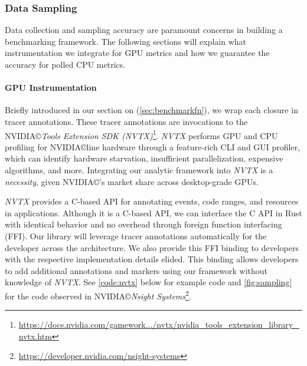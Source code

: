 \subsubsection{Data Sampling}
Data collection and sampling accuracy are paramount concerns in building a benchmarking framework. The following sections will explain what instrumentation we integrate for GPU metrics and how we guarantee the accuracy for polled CPU metrics.

\paragraph{GPU Instrumentation}
Briefly introduced in our section on  (\cref{sec:benchmarkfn}), we wrap each closure in tracer annotations. These tracer annotations are invocations to the NVIDIA\copyright \textit{Tools Extension SDK (NVTX)}\footnote{\href{https://docs.nvidia.com/gameworks/content/gameworkslibrary/nvtx/nvidia_tools_extension_library_nvtx.htm}{https://docs.nvidia.com/gamework.../nvtx/nvidia\_tools\_extension\_library\_nvtx.htm}}. \textit{NVTX} performs GPU and CPU profiling for NVIDIA\copyright line hardware through a feature-rich CLI and GUI profiler, which can identify hardware starvation, insufficient parallelization, expensive algorithms, and more. Integrating our analytic framework into \textit{NVTX} is a \emph{necessity}, given NVIDIA\copyright's market share across desktop-grade GPUs.\medskip

\textit{NVTX} provides a C-based API for annotating events, code ranges, and resources in applications. Although it is a C-based API, we can interface the C API in Rust with identical behavior and no overhead through foreign function interfacing (FFI)\cite{Crichton15}. Our library will leverage tracer annotations automatically for the developer across the architecture. We also provide this FFI binding to developers with the respective implementation details elided. This binding allows developers to add additional annotations and markers using our framework without knowledge of \textit{NVTX}. See \cref{code:nvtx} below for example code and \cref{fig:sampling} for the code observed in NVIDIA\copyright \textit{Nsight Systems}\footnote{\href{https://developer.nvidia.com/nsight-systems}{https://developer.nvidia.com/nsight-systems}}.

